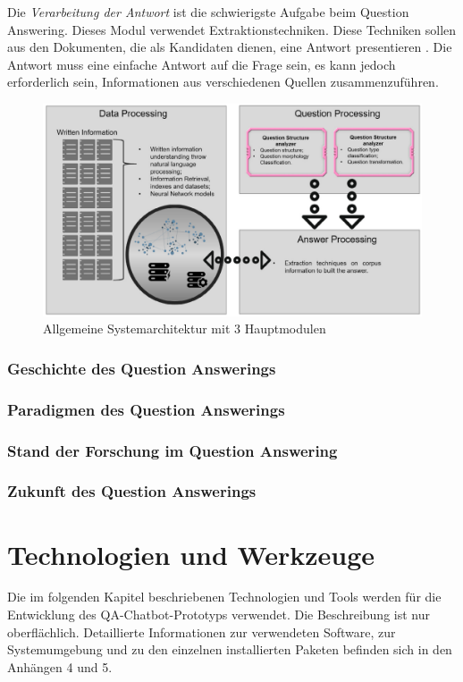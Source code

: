 \documentclass[
        ngerman,
        paper=a4,
        numbers=noendperiod,
]{scrreprt}
\begin{document}
Die \textit{Verarbeitung der Antwort} ist die schwierigste Aufgabe beim Question Answering. Dieses Modul verwendet Extraktionstechniken. Diese Techniken sollen aus den Dokumenten, die als Kandidaten dienen, eine Antwort presentieren \citep{Bhoir2014QuestionApproach}. Die Antwort muss eine einfache Antwort auf die Frage sein, es kann jedoch erforderlich sein, Informationen aus verschiedenen Quellen zusammenzuführen.

\begin{figure}[H]
    \centering\includegraphics[width=1\linewidth]{images/arch.png}
    \caption[Systemarchitektur]{Allgemeine Systemarchitektur mit 3 Hauptmodulen \cite [S. 3]{CalijorneSoares2018ASystems}}
    \label{fig:architektur}
\end{figure}
\subsection{Geschichte des Question Answerings}
\subsection{Paradigmen des Question Answerings}
\subsection{Stand der Forschung im Question Answering}
\subsection{Zukunft des Question Answerings}

\chapter{Technologien und Werkzeuge}
Die im folgenden Kapitel beschriebenen Technologien und Tools werden für die Entwicklung des QA-Chatbot-Prototyps verwendet. Die Beschreibung ist nur oberflächlich. Detaillierte Informationen zur verwendeten Software, zur Systemumgebung und zu den einzelnen installierten Paketen befinden sich in den Anhängen 4 und 5. %
\end{document}

